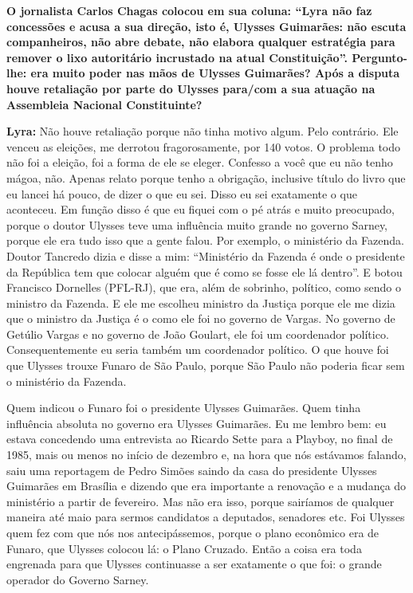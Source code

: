 \textbf{O jornalista Carlos Chagas colocou em sua coluna: ``Lyra não faz
concessões e acusa a sua direção, isto é, Ulysses Guimarães: não escuta
companheiros, não abre debate, não elabora qualquer estratégia para
remover o lixo autoritário incrustado na atual Constituição''.
Pergunto-lhe: era muito poder nas mãos de Ulysses Guimarães? Após a
disputa houve retaliação por parte do Ulysses para/com a sua atuação na
Assembleia Nacional Constituinte?}

\textbf{Lyra:} Não houve retaliação porque não tinha motivo algum. Pelo
contrário. Ele venceu as eleições, me derrotou fragorosamente, por 140
votos. O problema todo não foi a eleição, foi a forma de ele se eleger.
Confesso a você que eu não tenho mágoa, não. Apenas relato porque tenho
a obrigação, inclusive título do livro que eu lancei há pouco, de dizer
o que eu sei. Disso eu sei exatamente o que aconteceu. Em função disso é
que eu fiquei com o pé atrás e muito preocupado, porque o doutor Ulysses
teve uma influência muito grande no governo Sarney, porque ele era tudo
isso que a gente falou. Por exemplo, o ministério da Fazenda. Doutor
Tancredo dizia e disse a mim: ``Ministério da Fazenda é onde o
presidente da República tem que colocar alguém que é como se fosse ele
lá dentro''. E botou Francisco Dornelles (PFL-RJ), que era, além de
sobrinho, político, como sendo o ministro da Fazenda. E ele me escolheu
ministro da Justiça porque ele me dizia que o ministro da Justiça é o
como ele foi no governo de Vargas. No governo de Getúlio Vargas e no
governo de João Goulart, ele foi um coordenador político.
Consequentemente eu seria também um coordenador político. O que houve
foi que Ulysses trouxe Funaro de São Paulo, porque São Paulo não poderia
ficar sem o ministério da Fazenda.

Quem indicou o Funaro foi o presidente Ulysses Guimarães. Quem tinha
influência absoluta no governo era Ulysses Guimarães. Eu me lembro bem:
eu estava concedendo uma entrevista ao Ricardo Sette para a Playboy, no
final de 1985, mais ou menos no início de dezembro e, na hora que nós
estávamos falando, saiu uma reportagem de Pedro Simões saindo da casa do
presidente Ulysses Guimarães em Brasília e dizendo que era importante a
renovação e a mudança do ministério a partir de fevereiro. Mas não era
isso, porque sairíamos de qualquer maneira até maio para sermos
candidatos a deputados, senadores etc. Foi Ulysses quem fez com que nós
nos antecipássemos, porque o plano econômico era de Funaro, que Ulysses
colocou lá: o Plano Cruzado. Então a coisa era toda engrenada para que
Ulysses continuasse a ser exatamente o que foi: o grande operador do
Governo Sarney.

